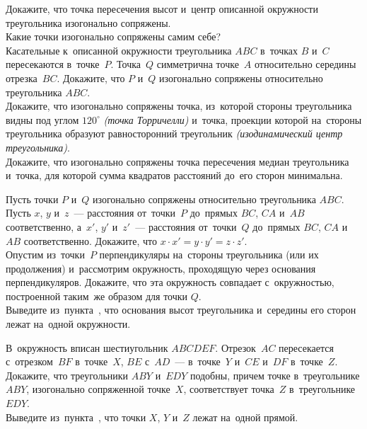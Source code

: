 \begin{problems}

\item
\subproblem
Докажите, что точка пересечения высот и~центр описанной окружности
треугольника изогонально сопряжены.
\\
\subproblem
Какие точки изогонально сопряжены самим себе?
\\
\subproblem
Касательные к~описанной окружности треугольника $ABC$ в~точках $B$ и~$C$
пересекаются в~точке~$P$.
Точка~$Q$ симметрична точке~$A$ относительно середины отрезка~$BC$.
Докажите, что $P$ и~$Q$ изогонально сопряжены относительно треугольника $ABC$.
\\
\subproblem
Докажите, что изогонально сопряжены точка, из~которой стороны треугольника
видны под углом $120^{\circ}$ \emph{(точка Торричелли)} и~точка, проекции
которой на~стороны треугольника образуют равносторонний треугольник
\emph{(изодинамический центр треугольника)}.
\\
\subproblem
Докажите, что изогонально сопряжены точка пересечения медиан треугольника
и~точка, для которой сумма квадратов расстояний до~его сторон минимальна.

\item
\subproblem
Пусть точки $P$ и~$Q$ изогонально сопряжены относительно треугольника $ABC$.
Пусть $x$, $y$ и~$z$~--- расстояния от~точки~$P$ до~прямых $BC$, $CA$ и~$AB$
соответственно, а~$x'$, $y'$ и~$z'$~--- расстояния от~точки~$Q$
до~прямых $BC$, $CA$ и~$AB$ соответственно.
Докажите, что $x \cdot x' = y \cdot y' = z \cdot z'$.
\\
\subproblem{}%
Опустим из~точки~$P$ перпендикуляры на~стороны треугольника
(или их продолжения) и~рассмотрим окружность, проходящую через основания
перпендикуляров.
Докажите, что эта окружность совпадает с~окружностью, построенной таким~же
образом для точки $Q$.
\\
\subproblem
Выведите из~пункта~, что
основания высот треугольника и~середины его сторон лежат на~одной окружности.

\item
\subproblem{}%
В~окружность вписан шестиугольник $ABCDEF$.
Отрезок~$AC$ пересекается с~отрезком~$BF$ в~точке~$X$, $BE$ с~$AD$~---
в~точке~$Y$ и~$CE$ и~$DF$ в~точке~$Z$.
Докажите, что треугольники $ABY$ и~$EDY$ подобны, причем точке
в~треугольнике $ABY$, изогонально сопряженной точке~$X$, соответствует
точка~$Z$ в~треугольнике $EDY$.
\\
\subproblem
Выведите из~пункта~,
что точки $X$, $Y$ и~$Z$ лежат на~одной прямой.


\end{problems}
